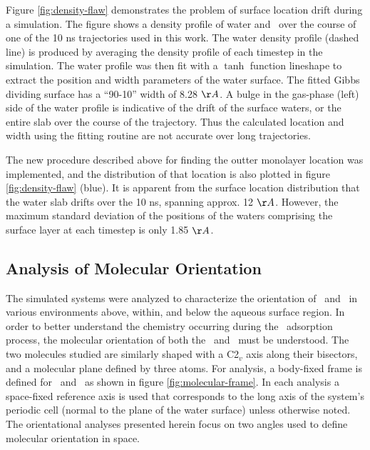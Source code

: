 Figure \ref{fig:density-flaw} demonstrates the problem of surface location drift during a simulation. The figure shows a density profile of water and \suldiox~over the course of one of the 10 ns trajectories used in this work. The water density profile (dashed line) is produced by averaging the density profile of each timestep in the simulation. The water profile was then fit with a $\tanh$ function lineshape to extract the position and width parameters of the water surface. The fitted Gibbs dividing surface has a ``90-10'' width of 8.28 $\AA$. A bulge in the gas-phase (left) side of the water profile is indicative of the drift of the surface waters, or the entire slab over the course of the trajectory. Thus the calculated location and width using the fitting routine are not accurate over long trajectories. 

The new procedure described above for finding the outter monolayer location was implemented, and the distribution of that location is also plotted in figure \ref{fig:density-flaw} (blue). It is apparent from the surface location distribution that the water slab drifts over the 10 ns, spanning approx. 12 $\AA$. However, the maximum standard deviation of the positions of the waters comprising the surface layer at each timestep is only 1.85 $\AA$. 



\subsection{Analysis of Molecular Orientation}

	The simulated systems were analyzed to characterize the orientation of \wat~and \suldiox~in various environments above, within, and below the aqueous surface region. In order to better understand the chemistry occurring during the \suldiox~adsorption process, the molecular orientation of both the \wat~and \suldiox~must be understood.  The two molecules studied are similarly shaped with a C2$_v$ axis along their bisectors, and a molecular plane defined by three atoms. For analysis, a body-fixed frame is defined for \wat~and \suldiox~as shown in figure \ref{fig:molecular-frame}. In each analysis a space-fixed reference axis is used that corresponds to the long axis of the system's periodic cell (normal to the plane of the water surface) unless otherwise noted. The orientational analyses presented herein focus on two angles used to define molecular orientation in space. 
	
